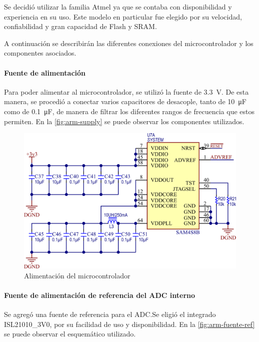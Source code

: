 \documentclass[titlepage, 12pt]{article}
\begin{document}
Se decidió utilizar la familia Atmel ya que se contaba con disponibilidad y experiencia en su uso. Este modelo en particular fue elegido por su velocidad, confiabilidad y gran capacidad de Flash y SRAM.

A continuación se describirán las diferentes conexiones del microcontrolador y los componentes asociados.

\paragraph{Fuente de alimentación}
Para poder alimentar al microcontrolador, se utilizó la fuente de \SI{3.3}{V}. De esta manera, se procedió a conectar varios capacitores de desacople, tanto de \SI{10}{\micro F} como de \SI{0.1}{\micro F}, de manera de filtrar los diferentes rangos de frecuencia que estos permiten. En la \autoref{fig:arm-supply} se puede observar los componentes utilizados.

    \begin{figure}[!htbp]
        \centering
        \includegraphics[scale=1.5]{images/arm-supply.png}
        \caption{Alimentación del microcontrolador}
        \label{fig:arm-supply}
    \end{figure}

\paragraph{Fuente de alimentación de referencia del ADC interno}
Se agregó una fuente de referencia para el ADC.Se eligió el integrado ISL21010\_3V0, por su facilidad de uso y disponibilidad. En la \autoref{fig:arm-fuente-ref} se puede observar el esquemático utilizado.
\end{document}
